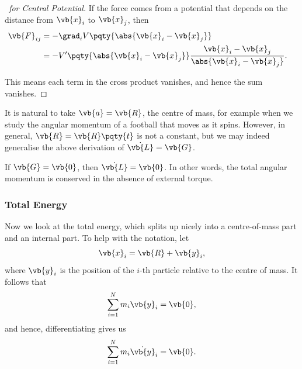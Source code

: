 \begin{proof}[\proofname\ for Central Potential]
    If the force comes from a potential that depends on the distance from \(\vb{x}_i\) to \(\vb{x}_j\), then
    \begin{subequations}\begin{align}
        \vb{F}_{ij} &= - \grad_{i} V\pqty{\abs{\vb{x}_i - \vb{x}_j}} && \\
        &= - V' \pqty{\abs{\vb{x}_i - \vb{x}_j}} \frac{\vb{x}_i - \vb{x}_j}{\abs{\vb{x}_i - \vb{x}_j}}.
    \end{align}\end{subequations}

    This means each term in the cross product vanishes, and hence the sum vanishes.
\end{proof} 

It is natural to take \(\vb{a} = \vb{R}\), the centre of mass, for example when we study the angular momentum of a football that moves as it spins. However, in general, \(\vb{R} = \vb{R}\pqty{t}\) is not a constant, but we may indeed generalise the above derivation of \(\dot{\vb{L}} = \vb{G}\).

\begin{corollary}
    \label{cor:conservation-of-angular-momentum}%
    If \(\vb{G} = \vb{0}\), then \(\dot{\vb{L}} = \vb{0}\). In other words, the total angular momentum is conserved in the absence of external torque. 
\end{corollary}

\subsubsection{Total Energy}

Now we look at the total energy, which splits up nicely into a centre-of-mass part and an internal part. To help with the notation, let
\begin{equation}
    \vb{x}_i = \vb{R} + \vb{y}_i,
\end{equation}
where \(\vb{y}_i\) is the position of the \(i\)-th particle relative to the centre of mass. It follows that
\begin{equation}
    \sum_{i = 1}^{N} m_i \vb{y}_i = \vb{0},
\end{equation}
and hence, differentiating gives us
\begin{equation}
    \sum_{i = 1}^{N} m_i \dot{\vb{y}}_i = \vb{0}.
\end{equation}

